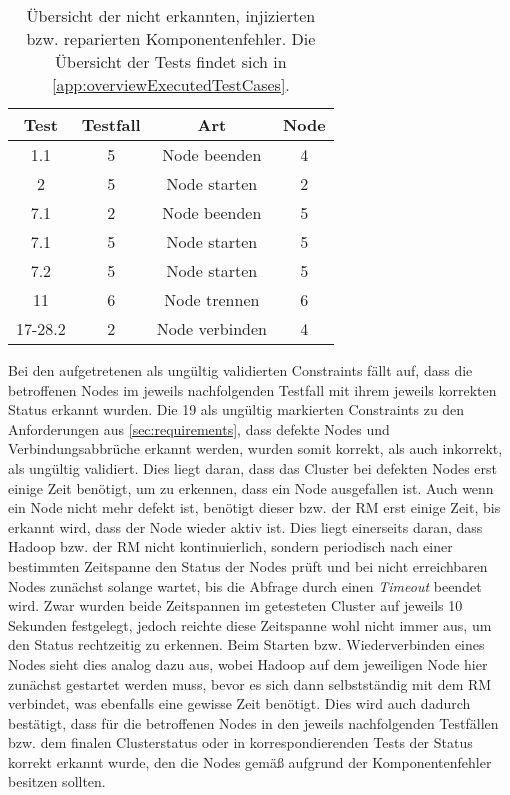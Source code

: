 \begin{table}[h]
    \begin{tabular}{c|ccc}
    	 \gls{Test}   & \gls{Testfall} &      Art       & Node \\ \hline
    	  1.1   &    5     &  Node beenden  &  4   \\
    	   2    &    5     &  Node starten  &  2   \\
    	  7.1   &    2     &  Node beenden  &  5   \\
    	  7.1   &    5     &  Node starten  &  5   \\
    	  7.2   &    5     &  Node starten  &  5   \\
    	  11    &    6     &  Node trennen  &  6   \\
    	17-28.2 &    2     & Node verbinden &  4
    \end{tabular} 
    \caption[Übersicht der nicht erkannten, injizierten/reparierten Komponentenfehler]
    {Übersicht der nicht erkannten, injizierten bzw. reparierten Komponentenfehler. Die Übersicht der Tests findet sich in \cref{app:overviewExecutedTestCases}.}
    \label{tab:notDetectedFaults}
\end{table}

Bei den aufgetretenen als ungültig validierten Constraints fällt auf, dass die betroffenen Nodes im jeweils nachfolgenden \gls{Testfall} mit ihrem jeweils korrekten Status erkannt wurden.
Die 19 als ungültig markierten Constraints zu den Anforderungen aus \cref{sec:requirements}, dass defekte Nodes und Verbindungsabbrüche erkannt werden, wurden somit korrekt, als auch inkorrekt, als ungültig validiert.
Dies liegt daran, dass das Cluster bei defekten Nodes erst einige Zeit benötigt, um zu erkennen, dass ein Node ausgefallen ist.
Auch wenn ein Node nicht mehr defekt ist, benötigt dieser bzw. der \gls{RM} erst einige Zeit, bis erkannt wird, dass der Node wieder aktiv ist.
Dies liegt einerseits daran, dass Hadoop bzw. der \gls{RM} nicht kontinuierlich, sondern periodisch nach einer bestimmten Zeitspanne den Status der Nodes prüft und bei nicht erreichbaren Nodes zunächst solange wartet, bis die Abfrage durch einen \emph{Timeout} beendet wird.
Zwar wurden beide Zeitspannen im getesteten Cluster auf jeweils 10 Sekunden festgelegt, jedoch reichte diese Zeitspanne wohl nicht immer aus, um den Status rechtzeitig zu erkennen.
Beim Starten bzw. Wiederverbinden eines Nodes sieht dies analog dazu aus, wobei Hadoop auf dem jeweiligen Node hier zunächst gestartet werden muss, bevor es sich dann selbstständig mit dem \gls{RM} verbindet, was ebenfalls eine gewisse Zeit benötigt.
Dies wird auch dadurch bestätigt, dass für die betroffenen Nodes in den jeweils nachfolgenden Testfällen bzw. dem finalen Clusterstatus oder in korrespondierenden \glspl{Test} der Status korrekt erkannt wurde, den die Nodes gemäß aufgrund der Komponentenfehler besitzen sollten.

